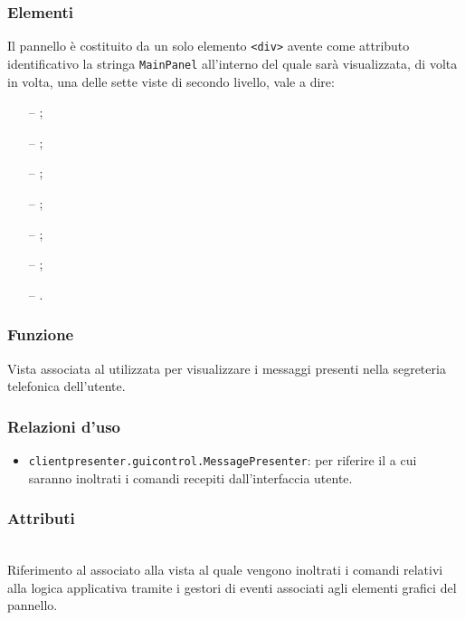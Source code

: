 \subsubsection*{Elementi}
Il pannello è costituito da un solo elemento \verb'<div>' avente come attributo identificativo la stringa \verb'MainPanel' all'interno del quale sarà visualizzata, di volta in volta, una delle sette viste di secondo livello, vale a dire:
\begin{itemize}
  \item[--] ;
  \item[--] ;
  \item[--] ;
  \item[--] ;
  \item[--] ;
  \item[--] ;
  \item[--] .
\end{itemize}


\subsubsection*{Funzione}
Vista associata al   utilizzata per visualizzare i messaggi presenti nella segreteria telefonica dell'utente.

\subsubsection*{Relazioni d'uso}
\begin{itemize}
  \item \texttt{clientpresenter.guicontrol.MessagePresenter}: per riferire il  a cui saranno inoltrati i comandi recepiti dall'interfaccia utente.
\end{itemize}

\subsubsection*{Attributi}
\begin{description}
  \item{}\\
  Riferimento al  associato alla vista al quale vengono inoltrati i comandi relativi alla logica applicativa tramite i gestori di eventi associati agli elementi grafici del pannello.
\end{description}

